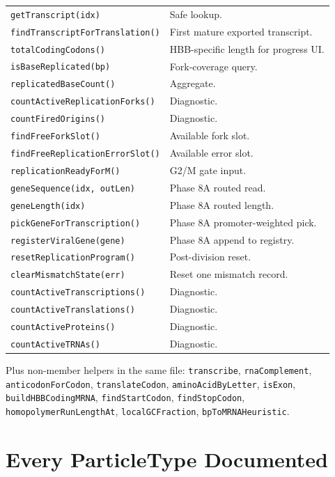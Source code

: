 \documentclass[11pt,letterpaper,twoside,openany]{book}
\newcommand{\code}[1]{\texttt{#1}}
\begin{document}
\begin{longtable}{p{5.5cm}p{8.0cm}}
\code{getTranscript(idx)} & Safe lookup.\\
\code{findTranscriptForTranslation()} & First mature exported transcript.\\
\code{totalCodingCodons()} & HBB-specific length for progress UI.\\
\code{isBaseReplicated(bp)} & Fork-coverage query.\\
\code{replicatedBaseCount()} & Aggregate.\\
\code{countActiveReplicationForks()} & Diagnostic.\\
\code{countFiredOrigins()} & Diagnostic.\\
\code{findFreeForkSlot()} & Available fork slot.\\
\code{findFreeReplicationErrorSlot()} & Available error slot.\\
\code{replicationReadyForM()} & G2/M gate input.\\
\code{geneSequence(idx, outLen)} & Phase 8A routed read.\\
\code{geneLength(idx)} & Phase 8A routed length.\\
\code{pickGeneForTranscription()} & Phase 8A promoter-weighted pick.\\
\code{registerViralGene(gene)} & Phase 8A append to registry.\\
\code{resetReplicationProgram()} & Post-division reset.\\
\code{clearMismatchState(err)} & Reset one mismatch record.\\
\code{countActiveTranscriptions()} & Diagnostic.\\
\code{countActiveTranslations()} & Diagnostic.\\
\code{countActiveProteins()} & Diagnostic.\\
\code{countActiveTRNAs()} & Diagnostic.\\
\bottomrule
\end{longtable}

Plus non-member helpers in the same file:
\code{transcribe}, \code{rnaComplement}, \code{anticodonForCodon},
\code{translateCodon}, \code{aminoAcidByLetter},
\code{isExon}, \code{buildHBBCodingMRNA}, \code{findStartCodon},
\code{findStopCodon}, \code{homopolymerRunLengthAt},
\code{localGCFraction}, \code{bpToMRNAHeuristic}.

\chapter{Every ParticleType Documented}
\label{ch:particle-types}
\end{document}
